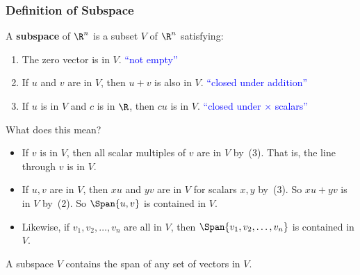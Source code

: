 \begin{frame}
\frametitle{Definition of Subspace}

\vskip-3mm
\begin{defn}
  A \textbf{subspace} of $\R^n$ is a subset $V$ of $\R^n$ satisfying:
  \begin{enumerate}
  \item The zero vector is in $V$.
    \hfill \pause\textcolor{blue}{``not empty''}
    \pause
  \item If $u$ and $v$ are in $V$, then $u+v$ is also in $V$.
    \hfill \pause\textcolor{blue}{``closed under addition''}
    \pause
  \item If $u$ is in $V$ and $c$ is in $\R$, then $cu$ is in $V$.
    \hfill \pause\textcolor{blue}{``closed under $\times$ scalars''}
  \end{enumerate}
\end{defn}

\pause\medskip
\alert{What does this mean?}
\begin{itemize}
\item If $v$ is in $V$, then all scalar multiples of $v$ are in $V$ by~(3).
  \pause
  That is, the line through $v$ is in $V$.

  \pause
\item If $u,v$ are in $V$, then $xu$ and $yv$ are in $V$ for scalars $x,y$ by~(3).
  \pause
  So $xu+yv$ is in $V$ by~(2).
  \pause
  So $\Span\{u,v\}$ is contained in $V$.

  \pause
\item Likewise, if $v_1,v_2,\ldots,v_n$ are all in $V$, then 
  $\Span\{v_1,v_2,\ldots,v_n\}$ is contained in $V$.

\end{itemize}

\pause\medskip
\begin{bluebox}{.75\linewidth}
  A subspace $V$ contains the span of any set of vectors in $V$.
\end{bluebox}

\end{frame}



